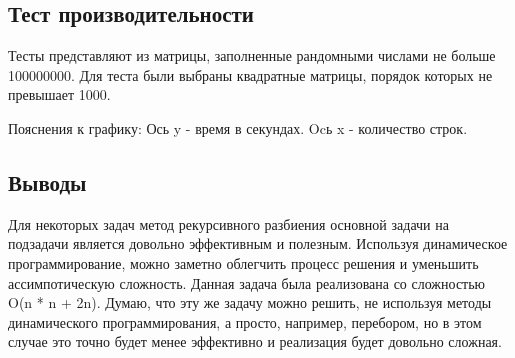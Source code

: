 \documentclass[12pt]{article}
\begin{document}
\subsection*{Тест производительности}

Тесты представляют из матрицы, заполненные рандомными числами не больше 100000000. Для теста были выбраны квадратные матрицы, порядок которых не превышает 1000.

\newline
Пояснения к графику:
Ось y - время в секундах. Ocь x - количество строк.

\subsection*{Выводы}

Для некоторых задач метод рекурсивного разбиения основной задачи на подзадачи является довольно эффективным и полезным. Используя динамическое программирование, можно заметно облегчить процесс решения и уменьшить ассимпотическую сложность. Данная задача была реализована со сложностью O(n * n + 2n). Думаю, что эту же задачу можно решить, не используя методы динамического программирования, а просто, например, перебором, но в этом случае это точно будет менее эффективно и реализация будет довольно сложная.
\end{document}
